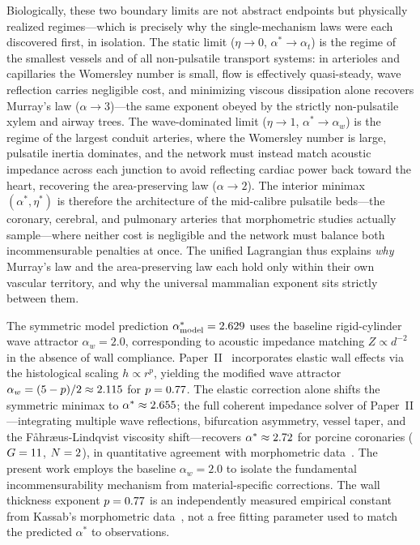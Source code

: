 Biologically, these two boundary limits are not abstract endpoints but
physically realized regimes---which is precisely why the single-mechanism laws
were each discovered first, in isolation. The static limit ($\eta\to0$,
$\alpha^*\to\alpha_t$) is the regime of the smallest vessels and of all
non-pulsatile transport systems: in arterioles and capillaries the Womersley
number is small, flow is effectively quasi-steady, wave reflection carries
negligible cost, and minimizing viscous dissipation alone recovers Murray's law
($\alpha\to3$)---the same exponent obeyed by the strictly non-pulsatile xylem
and airway trees. The wave-dominated limit ($\eta\to1$, $\alpha^*\to\alpha_w$)
is the regime of the largest conduit arteries, where the Womersley number is
large, pulsatile inertia dominates, and the network must instead match acoustic
impedance across each junction to avoid reflecting cardiac power back toward the
heart, recovering the area-preserving law ($\alpha\to2$). The interior minimax
$(\alpha^*,\eta^*)$ is therefore the architecture of the mid-calibre pulsatile
beds---the coronary, cerebral, and pulmonary arteries that morphometric studies
actually sample---where neither cost is negligible and the network must balance
both incommensurable penalties at once. The unified Lagrangian thus explains
\emph{why} Murray's law and the area-preserving law each hold only within their
own vascular territory, and why the universal mammalian exponent sits strictly
between them.

\begin{remark}
The symmetric model prediction $\alpha^*_{\mathrm{model}} = 2.629$
uses the baseline rigid-cylinder wave attractor $\alpha_w = 2.0$, corresponding
to acoustic impedance matching $Z \propto d^{-2}$ in the absence of wall
compliance. Paper~II~\cite{paperII} incorporates elastic wall effects via the
histological scaling $h \propto r^p$, yielding the modified wave attractor
$\alpha_w = (5-p)/2 \approx 2.115$ for $p = 0.77$. The elastic
correction alone shifts the symmetric minimax to $\alpha^* \approx
2.655$; the full coherent impedance solver of
Paper~II---integrating multiple wave reflections, bifurcation asymmetry, vessel
taper, and the Fåhræus-Lindqvist viscosity shift---recovers $\alpha^* \approx
2.72$ for porcine coronaries ($G = 11$, $N = 2$), in
quantitative agreement with morphometric data~\cite{kassab1993}. The present
work employs the baseline $\alpha_w = 2.0$ to isolate the fundamental
incommensurability mechanism from material-specific corrections. The wall
thickness exponent $p = 0.77$ is an independently measured empirical constant
from Kassab's morphometric data~\cite{kassab1993}, not a free fitting parameter
used to match the predicted $\alpha^*$ to observations.
\end{remark}

